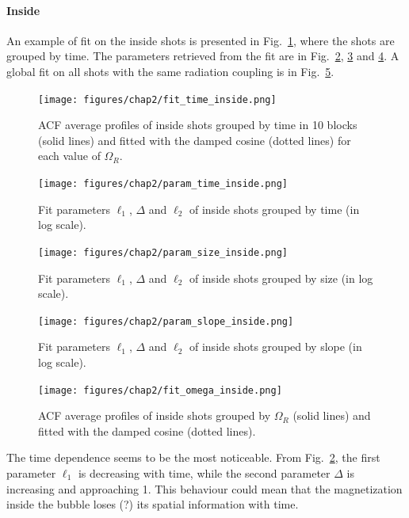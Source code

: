 \paragraph{Inside}
An example of fit on the inside shots is presented in Fig.\ \ref{fig:fit_time_inside}, where the shots are grouped by time. The parameters retrieved from the fit are in Fig.\ \ref{fig:param_time_inside}, \ref{fig:param_size_inside} and \ref{fig:param_slope_inside}. A global fit on all shots with the same radiation coupling is in Fig.\ \ref{fig:fit_omega_inside}.
\begin{figure}[h!]
    \centering
    \texttt{[image: figures/chap2/fit\_time\_inside.png]}
    \caption{ACF average profiles of inside shots grouped by time in 10 blocks (solid lines) and fitted with the damped cosine (dotted lines) for each value of $\Omega_R$.}
    \label{fig:fit_time_inside}
\end{figure}
\begin{figure}[h!]
    \centering
    \texttt{[image: figures/chap2/param\_time\_inside.png]}
    \caption{Fit parameters $\ell_1$, $\Delta$ and $\ell_2$ of inside shots grouped by time (in log scale).}
    \label{fig:param_time_inside}
\end{figure}
\begin{figure}[h!]
    \centering
    \texttt{[image: figures/chap2/param\_size\_inside.png]}
    \caption{Fit parameters $\ell_1$, $\Delta$ and $\ell_2$ of inside shots grouped by size (in log scale).}
    \label{fig:param_size_inside}
\end{figure}
\begin{figure}[h!]
    \centering
    \texttt{[image: figures/chap2/param\_slope\_inside.png]}
    \caption{Fit parameters $\ell_1$, $\Delta$ and $\ell_2$ of inside shots grouped by slope (in log scale).}
    \label{fig:param_slope_inside}
\end{figure}
\begin{figure}[h!]
    \centering
    \texttt{[image: figures/chap2/fit\_omega\_inside.png]}
    \caption{ACF average profiles of inside shots grouped by $\Omega_R$ (solid lines) and fitted with the damped cosine (dotted lines).}
    \label{fig:fit_omega_inside}
\end{figure}
The time dependence seems to be the most noticeable. From Fig.\ \ref{fig:param_time_inside}, the first parameter $\ell_1$ is decreasing with time, while the second parameter $\Delta$ is increasing and approaching 1. This behaviour could mean that the magnetization inside the bubble loses (?) its spatial information with time.

